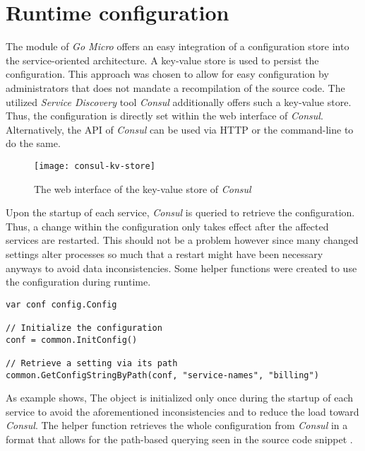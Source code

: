 \documentclass[12pt,a4paper,twoside]{report}
\begin{document}
\section{Runtime configuration}

The  module of \textit{Go Micro} offers an easy integration
of a configuration store into the service-oriented architecture.
A key-value store is used to persist the configuration.
This approach was chosen to allow for easy configuration by administrators
that does not mandate a recompilation of the source code.
The utilized \textit{Service Discovery} tool \textit{Consul} additionally offers
such a key-value store. Thus, the configuration is directly set within the
web interface of \textit{Consul}. Alternatively, the API of \textit{Consul}
can be used via HTTP or the command-line to do the same.

\begin{figure}[htbp]
\centering
\texttt{[image: consul-kv-store]}
\caption{The web interface of the key-value store of \textit{Consul}}
\label{fig:consul-kv-store}
\end{figure}

Upon the startup of each service, \textit{Consul} is queried to retrieve the
configuration. Thus, a change within the configuration only takes effect
after the affected services are restarted. This should not be a problem however
since many changed settings alter processes so much that a restart might
have been necessary anyways to avoid data inconsistencies.
Some helper functions were created to use the configuration during runtime.

\begin{lstlisting}[title=services/billing/main.go, float, floatplacement=H]
var conf config.Config

// Initialize the configuration
conf = common.InitConfig()

// Retrieve a setting via its path
common.GetConfigStringByPath(conf, "service-names", "billing")
\end{lstlisting}

As example  shows, The  object
is initialized only once during the startup of each service
to avoid the aforementioned inconsistencies and to reduce the load
toward \textit{Consul}. The helper function  retrieves
the whole configuration from \textit{Consul} in a format that allows for the
path-based querying seen in the source code snippet .
\end{document}
